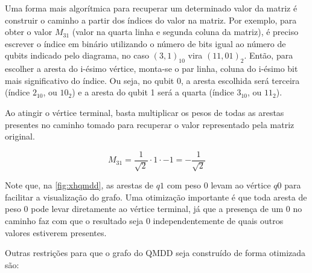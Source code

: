 Uma forma mais algorítmica para recuperar um determinado valor da matriz é construir o caminho a partir dos índices do valor na matriz. Por exemplo, para obter o valor $M_{31}$ (valor na quarta linha e segunda coluna da matriz), é preciso escrever o índice em binário utilizando o número de bits igual ao número de qubits indicado pelo diagrama, no caso $(3, 1)_{10}$ vira $(11, 01)_2$. Então, para escolher a aresta do i-ésimo vértice, monta-se o par linha, coluna do i-ésimo bit mais significativo do índice. Ou seja, no qubit 0, a aresta escolhida será terceira (índice $2_{10}$, ou $10_2$) e a aresta do qubit 1 será a quarta (índice $3_{10}$, ou $11_2$).

Ao atingir o vértice terminal, basta multiplicar os pesos de todas as arestas presentes no caminho tomado para recuperar o valor representado pela matriz original.

\begin{equation}
  M_{31} = \frac{1}{\sqrt{2}} \cdot 1 \cdot -1 = -\frac{1}{\sqrt{2}}
\end{equation}

Note que, na \cref{fig:xhqmdd}, as arestas de $q1$ com peso 0 levam ao vértice $q0$ para facilitar a visualização do grafo. Uma otimização importante é que toda aresta de peso 0 pode levar diretamente ao vértice terminal, já que a presença de um 0 no caminho faz com que o resultado seja 0 independentemente de quais outros valores estiverem presentes.

Outras restrições para que o grafo do QMDD seja construído de forma otimizada são:

